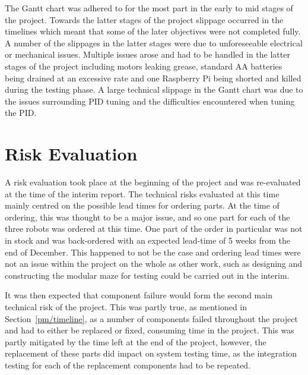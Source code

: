 The Gantt chart was adhered to for the most part in the early to 
mid stages of the project. Towards the latter stages of the 
project slippage occurred in the timelines which meant that some 
of the later objectives were not completed fully. A number 
of the slippages in the latter stages were due to unforeseeable 
electrical or mechanical issues. Multiple issues arose and had to 
be handled in the latter stages of the project including motors 
leaking grease, standard AA batteries being drained at an 
excessive rate and one Raspberry Pi being shorted and killed 
during the testing phase. A large technical slippage in the Gantt 
chart was due to the issues surrounding PID tuning and the 
difficulties encountered when tuning the PID. 

\section{Risk Evaluation}\label{pm/riskeval}
A risk evaluation took place at the beginning of the project and 
was re-evaluated at the time of the interim report. The technical 
risks evaluated at this time mainly centred on the possible lead 
times for ordering parts. At the time of ordering, this was 
thought to be a major issue, and so one part for each of the three 
robots was ordered at this time. One part of the order in 
particular was not in stock and was back-ordered with an expected 
lead-time of 5 weeks from the end of December. This happened to 
not be the case and ordering lead times were not an issue within 
the project on the whole as other work, such as designing and 
constructing the modular maze for testing could be carried out in 
the interim. 

It was then expected that component failure would form the second 
main technical risk of the project. This was partly true, as 
mentioned in Section~\ref{pm/timeline}, as a number of components 
failed throughout the project and had to either be replaced or 
fixed, consuming time in the project. This was partly mitigated by 
the time left at the end of the project, however, the replacement 
of these parts did impact on system testing time, as the 
integration testing for each of the replacement components had to 
be repeated. 


